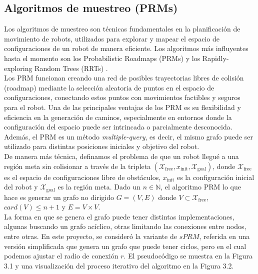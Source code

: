 \documentclass[spanish,mexico]{article}
\numberwithin{equation}{section}
\newcommand{\N}{\mathbb{N}}
\theoremstyle{definition}
\theoremstyle{remark}
\begin{document}
\subsection{Algoritmos de muestreo (PRMs)}
Los algoritmos de muestreo son técnicas fundamentales en la planificación de movimiento de robots, utilizados para explorar y mapear el espacio de configuraciones de un robot de manera eficiente. Los algoritmos más influyentes hasta el momento son los Probabilistic Roadmaps (PRMs) \cite{PRM} y los Rapidly-exploring Random Trees (RRTs) \cite{RRT}.\\

Los PRM funcionan creando una red de posibles trayectorias libres de colisión (roadmap) mediante la selección aleatoria de puntos en el espacio de configuraciones, conectando estos puntos con movimientos factibles y seguros para el robot. Una de las principales ventajas de los PRM es su flexibilidad y eficiencia en la generación de caminos, especialmente en entornos donde la configuración del espacio puede ser intrincada o parcialmente desconocida. Además, el PRM es un método \textit{multiple-query}, es decir, el mismo grafo puede ser utilizado para distintas posiciones iniciales y objetivo del robot.\\

De manera más técnica, definamos el problema de que un robot llegué a una región meta sin colisionar a través de la tripleta $(\mathcal{X}_{\text{free}}, x_{\text{init}}, \mathcal{X}_{\text{goal}})$, donde $\mathcal{X}_{\text{free}}$ es el espacio de configuraciones libre de obstáculos, $x_{\text{init}}$ es la configuración inicial del robot y $\mathcal{X}_{\text{goal}}$ es la región meta. Dado un $n\in \N$, el algoritmo PRM lo que hace es generar un grafo no dirigido $G = (V, E)$ donde $V \subset \mathcal{X}_{\text{free}}$, $card(V) \leq n+1$ y $E = V\times V$.\\

La forma en que se genera el grafo puede tener distintas implementaciones, algunas buscando un grafo acíclico, otras limitando las conexiones entre nodos, entre otras. En este proyecto, se consideró la variante de $sPRM$, referida en \cite{Optimal} una versión simplificada que genera un grafo que puede tener ciclos, pero en el cual podemos ajustar el radio de conexión $r$. El pseudocódigo se muestra en la Figura 3.1 y una visualización del proceso iterativo del algoritmo en la Figura 3.2.
\end{document}
